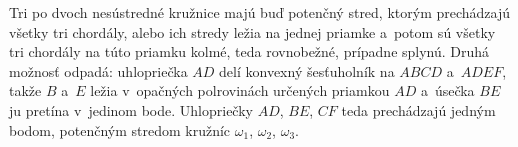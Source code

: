 {    Tri po dvoch nesústredné kružnice majú buď potenčný stred, ktorým prechádzajú všetky tri chordály, alebo ich stredy ležia na jednej priamke a~potom sú všetky tri chordály na túto priamku kolmé, teda rovnobežné, prípadne splynú. Druhá možnosť odpadá: uhlopriečka $AD$ delí konvexný šesťuholník na $ABCD$ a~$ADEF$, takže $B$ a~$E$ ležia v~opačných polrovinách určených priamkou $AD$ a~úsečka $BE$ ju pretína v~jedinom bode. Uhlopriečky $AD$, $BE$, $CF$ teda prechádzajú jedným bodom, potenčným stredom kružníc $\omega_1$, $\omega_2$, $\omega_3$.
}

\DisplayHints

\DisplayProblemSolutions

\bye
